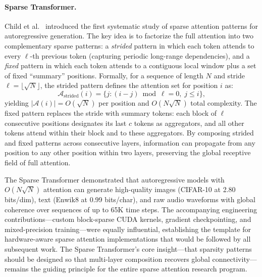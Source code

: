 \paragraph{Sparse Transformer.}
Child et al.~\cite{child2019generating} introduced the first systematic study of sparse attention patterns for autoregressive generation. The key idea is to factorize the full attention into two complementary sparse patterns: a \emph{strided} pattern in which each token attends to every $\ell$-th previous token (capturing periodic long-range dependencies), and a \emph{fixed} pattern in which each token attends to a contiguous local window plus a set of fixed ``summary'' positions. Formally, for a sequence of length $N$ and stride $\ell = \lfloor\sqrt{N}\rfloor$, the strided pattern defines the attention set for position $i$ as:
\begin{equation}
\mathcal{A}_{\text{strided}}(i) = \{j : (i - j) \bmod \ell = 0,\; j \leq i\},
\label{eq:sparse-strided}
\end{equation}
yielding $|\mathcal{A}(i)| = O(\sqrt{N})$ per position and $O(N\sqrt{N})$ total complexity. The fixed pattern replaces the stride with summary tokens: each block of $\ell$ consecutive positions designates its last $c$ tokens as aggregators, and all other tokens attend within their block and to these aggregators. By composing strided and fixed patterns across consecutive layers, information can propagate from any position to any other position within two layers, preserving the global receptive field of full attention.

The Sparse Transformer demonstrated that autoregressive models with $O(N\sqrt{N})$
attention can generate high-quality images (CIFAR-10 at 2.80 bits/dim), text (Enwik8 at
0.99 bits/char), and raw audio waveforms with global coherence over sequences of up to
65K time steps.
The accompanying engineering contributions---custom block-sparse CUDA kernels, gradient
checkpointing, and mixed-precision training---were equally influential, establishing the
template for hardware-aware sparse attention implementations that would be followed by
all subsequent work.
The Sparse Transformer's core insight---that sparsity patterns should be designed so that
multi-layer composition recovers global connectivity---remains the guiding principle for
the entire sparse attention research program.

